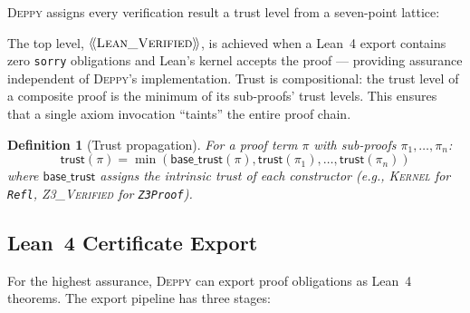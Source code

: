 \documentclass[acmsmall,nonacm,screen]{acmart}
\newtheorem{definition}[theorem]{Definition}
\newcommand{\deppy}{\textsc{Deppy}}
\newcommand{\trustlevel}[1]{\ensuremath{\langle\!\langle \text{#1} \rangle\!\rangle}}
\begin{document}
\deppy{} assigns every verification result a trust level from a
seven-point lattice:

\begin{center}
\end{center}

The top level, \trustlevel{\textsc{Lean\_Verified}}, is achieved when
a Lean~4 export contains zero \texttt{sorry} obligations and Lean's
kernel accepts the proof --- providing assurance independent of
\deppy{}'s implementation.  Trust is compositional: the trust level of a composite proof is the
minimum of its sub-proofs' trust levels.  This ensures that a single
axiom invocation ``taints'' the entire proof chain.

\begin{definition}[Trust propagation]
For a proof term $\pi$ with sub-proofs $\pi_1, \ldots, \pi_n$:
\[
  \mathsf{trust}(\pi) = \min(\mathsf{base\_trust}(\pi),
    \mathsf{trust}(\pi_1), \ldots, \mathsf{trust}(\pi_n))
\]
where $\mathsf{base\_trust}$ assigns the intrinsic trust of each
constructor (e.g., \textsc{Kernel} for \texttt{Refl},
\textsc{Z3\_Verified} for \texttt{Z3Proof}).
\end{definition}

\subsection{Lean~4 Certificate Export}

For the highest assurance, \deppy{} can export proof obligations as
Lean~4 theorems.  The export pipeline has three stages:
\end{document}
